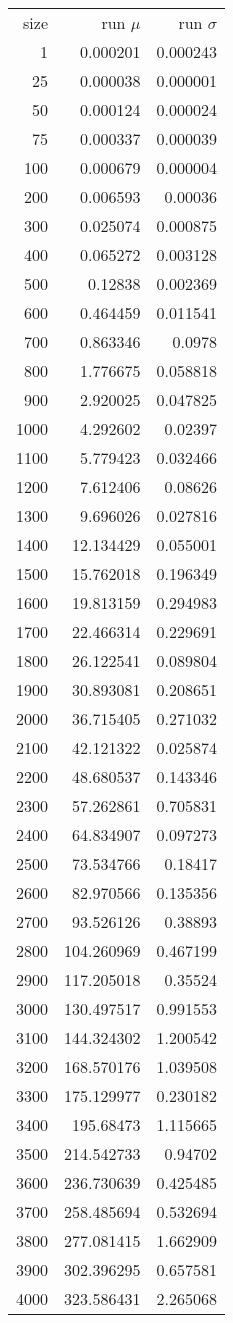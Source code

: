\begin{tabular}{r r r}
size & run $\mu$ & run $\sigma$ \\
1 & 0.000201 & 0.000243 \\
25 & 0.000038 & 0.000001 \\
50 & 0.000124 & 0.000024 \\
75 & 0.000337 & 0.000039 \\
100 & 0.000679 & 0.000004 \\
200 & 0.006593 & 0.00036 \\
300 & 0.025074 & 0.000875 \\
400 & 0.065272 & 0.003128 \\
500 & 0.12838 & 0.002369 \\
600 & 0.464459 & 0.011541 \\
700 & 0.863346 & 0.0978 \\
800 & 1.776675 & 0.058818 \\
900 & 2.920025 & 0.047825 \\
1000 & 4.292602 & 0.02397 \\
1100 & 5.779423 & 0.032466 \\
1200 & 7.612406 & 0.08626 \\
1300 & 9.696026 & 0.027816 \\
1400 & 12.134429 & 0.055001 \\
1500 & 15.762018 & 0.196349 \\
1600 & 19.813159 & 0.294983 \\
1700 & 22.466314 & 0.229691 \\
1800 & 26.122541 & 0.089804 \\
1900 & 30.893081 & 0.208651 \\
2000 & 36.715405 & 0.271032 \\
2100 & 42.121322 & 0.025874 \\
2200 & 48.680537 & 0.143346 \\
2300 & 57.262861 & 0.705831 \\
2400 & 64.834907 & 0.097273 \\
2500 & 73.534766 & 0.18417 \\
2600 & 82.970566 & 0.135356 \\
2700 & 93.526126 & 0.38893 \\
2800 & 104.260969 & 0.467199 \\
2900 & 117.205018 & 0.35524 \\
3000 & 130.497517 & 0.991553 \\
3100 & 144.324302 & 1.200542 \\
3200 & 168.570176 & 1.039508 \\
3300 & 175.129977 & 0.230182 \\
3400 & 195.68473 & 1.115665 \\
3500 & 214.542733 & 0.94702 \\
3600 & 236.730639 & 0.425485 \\
3700 & 258.485694 & 0.532694 \\
3800 & 277.081415 & 1.662909 \\
3900 & 302.396295 & 0.657581 \\
4000 & 323.586431 & 2.265068 \\
\end{tabular}

